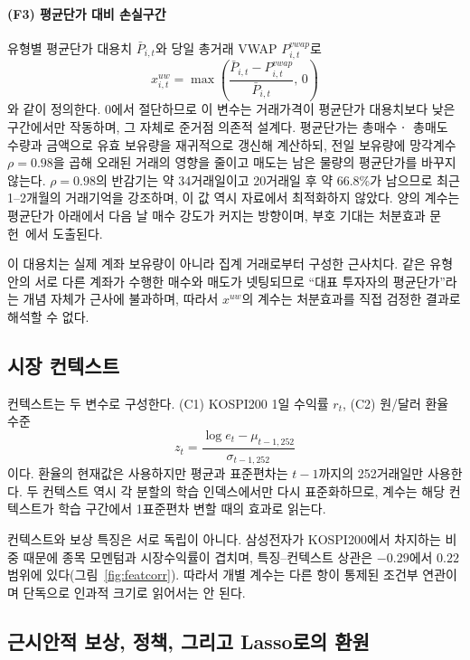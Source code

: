 \paragraph{(F3) 평균단가 대비 손실구간}
유형별 평균단가 대용치 $\bar P_{i,t}$와 당일 총거래 VWAP $P^{vwap}_{i,t}$로
\begin{equation}
x^{uw}_{i,t}=\max\!\left(
\frac{\bar P_{i,t}-P^{vwap}_{i,t}}{\bar P_{i,t}},\,0\right)
\label{eq:underwater}
\end{equation}
와 같이 정의한다. 0에서 절단하므로 이 변수는 거래가격이 평균단가 대용치보다
낮은 구간에서만 작동하며, 그 자체로 준거점 의존적 설계다. 평균단가는 총매수ㆍ
총매도 수량과 금액으로 유효 보유량을 재귀적으로 갱신해 계산하되, 전일 보유량에
망각계수 $\rho=0.98$을 곱해 오래된 거래의 영향을 줄이고 매도는 남은 물량의
평균단가를 바꾸지 않는다. $\rho=0.98$의 반감기는 약 34거래일이고 20거래일 후
약 66.8\%가 남으므로 최근 1--2개월의 거래기억을 강조하며, 이 값 역시 자료에서
최적화하지 않았다. 양의 계수는 평균단가 아래에서 다음 날 매수 강도가 커지는
방향이며, 부호 기대는 처분효과
문헌~\cite{shefrin1985disposition,odean1998investors}에서 도출된다.

이 대용치는 실제 계좌 보유량이 아니라 집계 거래로부터 구성한 근사치다. 같은
유형 안의 서로 다른 계좌가 수행한 매수와 매도가 넷팅되므로 ``대표 투자자의
평균단가''라는 개념 자체가 근사에 불과하며, 따라서 $x^{uw}$의 계수는
처분효과를 직접 검정한 결과로 해석할 수 없다.

\subsection{시장 컨텍스트}
\label{sec:context}

컨텍스트는 두 변수로 구성한다. (C1) KOSPI200 1일 수익률 $r_t$, (C2) 원/달러
환율 수준
\begin{equation}
z_t=\frac{\log e_t-\mu_{t-1,252}}{\sigma_{t-1,252}}
\label{eq:fxcontext}
\end{equation}
이다. 환율의 현재값은 사용하지만 평균과 표준편차는 $t-1$까지의 252거래일만
사용한다. 두 컨텍스트 역시 각 분할의 학습 인덱스에서만 다시 표준화하므로,
계수는 해당 컨텍스트가 학습 구간에서 1표준편차 변할 때의 효과로 읽는다.

컨텍스트와 보상 특징은 서로 독립이 아니다. 삼성전자가 KOSPI200에서 차지하는
비중 때문에 종목 모멘텀과 시장수익률이 겹치며, 특징--컨텍스트 상관은 $-0.29$에서
$0.22$ 범위에 있다(그림~\ref{fig:featcorr}). 따라서 개별 계수는 다른 항이
통제된 조건부 연관이며 단독으로 인과적 크기로 읽어서는 안 된다.

\subsection{근시안적 보상, 정책, 그리고 Lasso로의 환원}
\label{sec:model}

